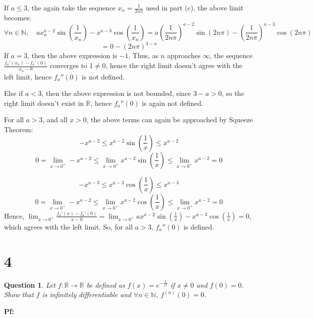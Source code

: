 \documentclass{article}
\newtheorem{question}{Question}
\begin{document}
\begin{itemize}
    \hfill

    If $a\leq 3$, the again take the sequence  $x_n=\frac{1}{2n\pi}$ used in part (c), the above limit becomes:
    $$\forall n\in\mathbb{N},\quad ax_n^{a-2}\sin\left(\frac{1}{x_n}\right)-x^{a-3}\cos\left(\frac{1}{x_n}\right) = a\left(\frac{1}{2n\pi}\right)^{a-2}\sin(2n\pi)-\left(\frac{1}{2n\pi}\right)^{a-3}\cos(2n\pi)$$
    $$= 0-(2n\pi)^{3-a}$$
    If $a=3$, then the above expression is $-1$. Thus, as $n$ approaches $\infty$, the sequence $\frac{f_a'(x_n)-f_a'(0)}{x_n-0}$ converges to $1\neq 0$, hence the right limit doesn't agree with the left limit, hence $f_a''(0)$ is not defined.

    Else if $a<3$, then the above expression is not bounded, since $3-a>0$, so the right limit doesn't exist in $\mathbb{R}$, hence $f_a''(0)$ is again not defined.

    \hfill

    For all $a>3$, and all $x>0$, the above terms can again be approached by Squeeze Theorem:
    $$-x^{a-2}\leq x^{a-2}\sin\left(\frac{1}{x}\right)\leq x^{a-2}$$
    $$0=\lim_{x\rightarrow0^+}-x^{a-2} \leq \lim_{x\rightarrow0^+}x^{a-2}\sin\left(\frac{1}{x}\right) \leq \lim_{x\rightarrow0^+}x^{a-2}=0$$
    
    $$-x^{a-3}\leq x^{a-3}\cos\left(\frac{1}{x}\right)\leq x^{a-3}$$
    $$0=\lim_{x\rightarrow 0^+}-x^{a-2}\leq \lim_{x\rightarrow 0^+}x^{a-2}\cos\left(\frac{1}{x}\right)\leq \lim_{x\rightarrow 0^+}x^{a-2}=0$$
    Hence, $\lim_{x\rightarrow 0^+}\frac{f_a'(x)-f_a'(0)}{x-0} = \lim_{x\rightarrow 0^+}ax^{a-2}\sin\left(\frac{1}{x}\right) - x^{a-3}\cos\left(\frac{1}{x}\right) = 0$, which agrees with the left limit.
    So, for all $a>3$, $f_a''(0)$ is defined.
\end{itemize}

\break

\section*{4}
\begin{myBox}[]{}
    \begin{question}
        Let $f:\mathbb{R}\rightarrow\mathbb{R}$ be defined as $f(x)=e^{-\frac{1}{x^2}}$
        if $x\neq 0$ and $f (0) = 0$.
        Show that $f$ is infinitely differentiable and $\forall n\in\mathbb{N},\ f^{(n)}(0)=0$.
    \end{question}
\end{myBox}

\textbf{Pf:}
\end{document}

